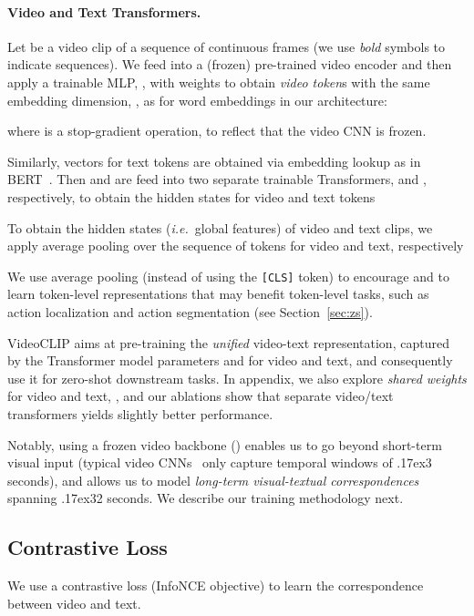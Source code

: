 \documentclass[11pt]{article}
\newcommand{\app}{\raise.17ex\hbox{}}
\begin{document}
\paragraph{Video and Text Transformers.}
Let  be a video clip of a sequence of continuous frames (we use  \textit{bold} symbols to indicate sequences). We feed  into a (frozen) pre-trained video encoder  and then apply a trainable MLP, , with weights  to obtain \textit{video token}s   with the same embedding dimension, , as for word embeddings in our architecture:

where  is a stop-gradient operation, to reflect that the video CNN is frozen. 

Similarly, vectors for text tokens  are obtained via embedding lookup as in BERT~\cite{devlin-etal-2019-bert}.
Then 
 and  are feed into 
two separate trainable Transformers,
 and , respectively,
to obtain the hidden states for video and text tokens

To obtain the hidden states (\textit{i.e.}~global features) of video and text clips, we apply average pooling over the sequence of tokens for video and text, respectively

We use average pooling (instead of using the \texttt{[CLS]} token) to encourage  and  to learn token-level representations that may benefit token-level tasks, such as action localization and action segmentation (see Section~\ref{sec:zs}).

VideoCLIP aims at pre-training the \textit{unified} video-text representation, captured by the 
Transformer model parameters  and  for video and text, and consequently use it for zero-shot downstream tasks. 
In appendix, we also explore \textit{shared weights} for video and text,  , and our ablations show that separate video/text transformers yields slightly better performance.

Notably, using a frozen video backbone () enables us to go beyond short-term visual input (typical video CNNs~\cite{xie2018rethinking,feichtenhofer2019slowfast} only capture temporal windows of \app3 seconds), and allows us to model \textit{long-term visual-textual correspondences} spanning \app32 seconds. We describe our training methodology next. 

\subsection{Contrastive Loss}
We use a contrastive loss (\mbox{InfoNCE} \cite{oord2018representation} objective) to learn the correspondence between video and text. 
\end{document}
